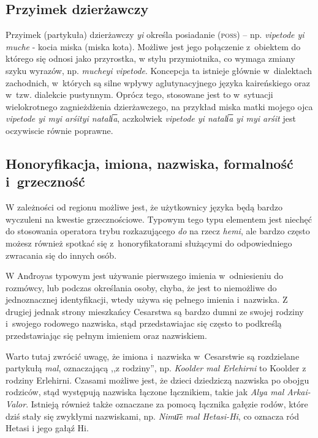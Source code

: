 \begin{spacing}{1.1}
\subsection{Przyimek dzierżawczy}

Przyimek (partykuła) dzierżawczy \emph{yi} określa posiadanie (\textsc{poss}) --
np. \emph{vipetode yi muche} - kocia miska (miska kota). Możliwe jest jego
połączenie z~obiektem do którego się odnosi jako przyrostka, w stylu
przymiotnika, co wymaga zmiany szyku wyrazów, np. \emph{mucheyi vipetode}.
Koncepcja ta istnieje głównie w~dialektach zachodnich, w~których są silne wpływy
aglutynacyjnego języka kaireńskiego oraz w~tzw. dialekcie pustynnym. Oprócz
tego, stosowane jest to w~sytuacji wielokrotnego zagnieżdżenia dzierżawczego, na
przykład miska matki mojego ojca \emph{vipetode yi myi arśityi natali͞a},
aczkolwiek \emph{vipetode yi natali͞a yi myi arśit} jest oczywiscie równie
poprawne. 

\subsection{Honoryfikacja, imiona, nazwiska, formalność i~grzeczność}

W zależności od regionu możliwe jest, że użytkownicy języka będą bardzo
wyczuleni na kwestie grzecznościowe. Typowym tego typu elementem jest niechęć do
stosowania operatora trybu rozkazującego \emph{do} na rzecz \emph{hemi}, ale
bardzo często możesz również spotkać się z~honoryfikatorami służącymi do
odpowiedniego zwracania się do innych osób.

W And́royas typowym jest używanie pierwszego imienia w~odniesieniu do rozmówcy,
lub podczas określania osoby, chyba, że jest to niemożliwe do jednoznacznej
identyfikacji, wtedy używa się pełnego imienia i~nazwiska. Z drugiej jednak
strony mieszkańcy Cesarstwa są bardzo dumni ze swojej rodziny i~swojego rodowego
nazwiska, stąd przedstawiajac się często to podkreślą przedstawiając się pełnym
imieniem oraz nazwiskiem.


Warto tutaj zwrócić uwagę, że imiona i~nazwiska w~Cesarstwie są rozdzielane
partykułą \emph{mal}, oznaczającą ,,z rodziny'', np. \emph{Koolder mal
Erlehirni} to Koolder z rodziny Erlehirni. Czasami możliwe jest, że dzieci
dziedziczą nazwiska po obojgu rodziców, stąd występują nazwiska łączone
łącznikiem, takie jak \emph{Alya mal Arkai-Valor}. Istnieją również także
oznaczane za pomocą łącznika gałęzie rodów, które dziś stały się zwykłymi
nazwiskami, np. \emph{Nimu͞e mal Hetasi-Hi}, co oznacza ród Hetasi i jego gałąź
Hi.


\end{spacing}
